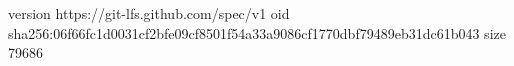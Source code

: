 version https://git-lfs.github.com/spec/v1
oid sha256:06f66fc1d0031cf2bfe09cf8501f54a33a9086cf1770dbf79489eb31dc61b043
size 79686
